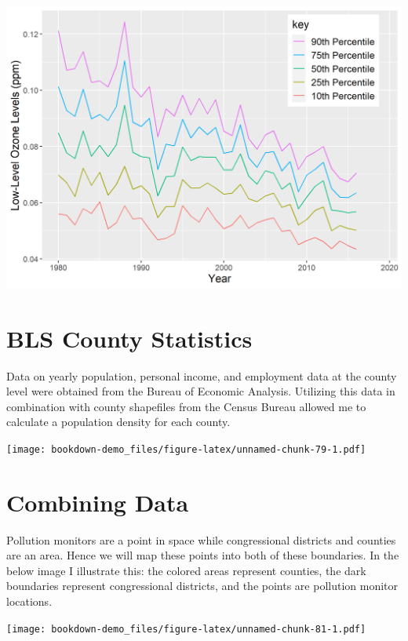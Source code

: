 \documentclass[
]{book}
\begin{document}
\begin{center}\includegraphics[width=0.8\linewidth]{img/unbalancedpolllevelsovertime} \end{center}

\hypertarget{bls-county-statistics}{%
\section{BLS County Statistics}\label{bls-county-statistics}}

Data on yearly population, personal income, and employment data at the county level were obtained from the Bureau of Economic Analysis. Utilizing this data in combination with county shapefiles from the Census Bureau allowed me to calculate a population density for each county.

\texttt{[image: bookdown-demo\_files/figure-latex/unnamed-chunk-79-1.pdf]}

\hypertarget{combining-data}{%
\section{Combining Data}\label{combining-data}}

Pollution monitors are a point in space while congressional districts and counties are an area. Hence we will map these points into both of these boundaries. In the below image I illustrate this: the colored areas represent counties, the dark boundaries represent congressional districts, and the points are pollution monitor locations.

\texttt{[image: bookdown-demo\_files/figure-latex/unnamed-chunk-81-1.pdf]}

  
\end{document}
